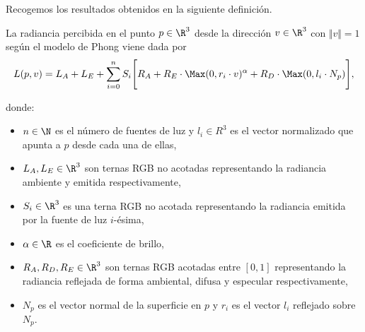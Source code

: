 Recogemos los resultados obtenidos en la siguiente definición.
\begin{definicion}\label{def:blinn} La radiancia percibida en el punto $p\in\R^3$ desde la dirección $v\in\R^3$ con $\Vert v\Vert = 1$ según el modelo de Phong viene dada por
    \begin{equation*}
        L(p,v) = L_A+L_E+ \sum_{i=0}^n S_i \Bigg[ R_A + R_E\cdot \Max(0,r_i\cdot v)^{\alpha} + R_D\cdot \Max(0,l_i\cdot N_p) \Bigg],
    \end{equation*}

    donde:
    \begin{itemize}
        \item $n \in \N$ es el número de fuentes de luz y $l_i \in R^3$ es el vector normalizado que apunta a $p$ desde cada una de ellas,
        \item $L_A,L_E \in \R^3$ son ternas RGB no acotadas representando la radiancia ambiente y emitida respectivamente,
        \item $S_i \in \R^3$ es una terna RGB no acotada representando la radiancia emitida por la fuente de luz $i$-ésima,
        \item $\alpha \in \R$ es el coeficiente de brillo,
        \item $R_A,R_D,R_E \in \R^3$ son ternas RGB acotadas entre $[0,1]$ representando la radiancia reflejada de forma ambiental, difusa y especular respectivamente,
        \item $N_p$ es el vector normal de la superficie en $p$ y $r_i$ es el vector $l_i$ reflejado sobre $N_p$.
    \end{itemize}
\end{definicion}

